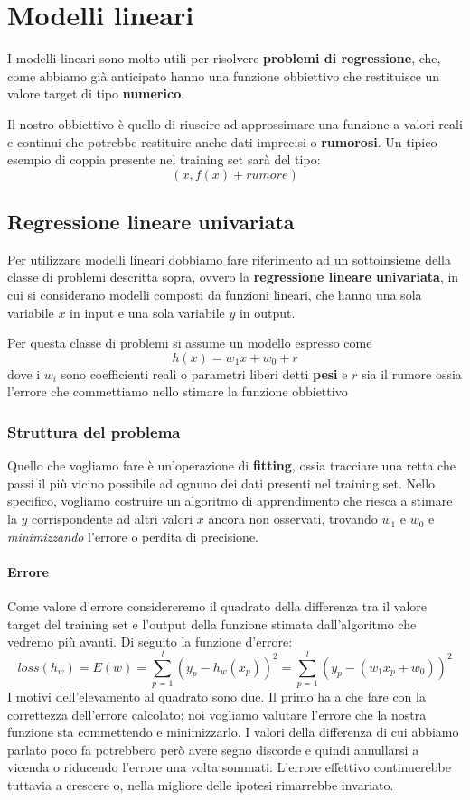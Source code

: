 \chapter{Modelli lineari}
I modelli lineari sono molto utili per risolvere \textbf{problemi di regressione}, che, come abbiamo gi\`a anticipato
hanno una funzione obbiettivo che restituisce un valore target di tipo \textbf{numerico}.

Il nostro obbiettivo \`e quello di riuscire ad approssimare una funzione a valori reali e continui che potrebbe restituire
anche dati imprecisi o \textbf{rumorosi}. Un tipico esempio di coppia presente nel training set sar\`a del tipo:
\[ (x, f(x) + rumore) \]

\section{Regressione lineare univariata}
Per utilizzare modelli lineari dobbiamo fare riferimento ad un sottoinsieme della classe di problemi descritta sopra, ovvero
la \textbf{regressione lineare univariata}, in cui si considerano modelli composti da funzioni lineari, che hanno una sola
variabile $x$ in input e una sola variabile $y$ in output.

Per questa classe di problemi si assume un modello espresso come
\[ h(x) = w_1 x + w_0 + r \]
dove i $w_i$ sono coefficienti reali o parametri liberi detti \textbf{pesi} e $r$ sia il rumore ossia l'errore che
commettiamo nello stimare la funzione obbiettivo

\subsection{Struttura del problema}
Quello che vogliamo fare \`e un'operazione di \textbf{fitting}, ossia tracciare una retta che passi il pi\`u vicino
possibile ad ognuno dei dati presenti nel training set. Nello specifico, vogliamo costruire un algoritmo di apprendimento
che riesca a stimare la $y$ corrispondente ad altri valori $x$ ancora non osservati, trovando $w_1$ e $w_0$ e
\emph{minimizzando} l'errore o perdita di precisione.

\subsubsection{Errore}
Come valore d'errore considereremo il quadrato della differenza tra il valore target del training set e l'output della
funzione stimata dall'algoritmo che vedremo pi\`u avanti. Di seguito la funzione d'errore:
\[ loss(h_w) = E(w) = \sum_{p=1}^l (y_p - h_w(x_p))^2 = \sum_{p=1}^l (y_p - (w_1 x_p + w_0))^2 \]
I motivi dell'elevamento al quadrato sono due. Il primo ha a che fare con la correttezza dell'errore calcolato: noi
vogliamo valutare l'errore che la nostra funzione sta commettendo e minimizzarlo. I valori della differenza di cui
abbiamo parlato poco fa potrebbero per\`o avere segno discorde e quindi annullarsi a vicenda o riducendo l'errore una
volta sommati. L'errore effettivo continuerebbe tuttavia a crescere o, nella migliore delle ipotesi rimarrebbe invariato.

